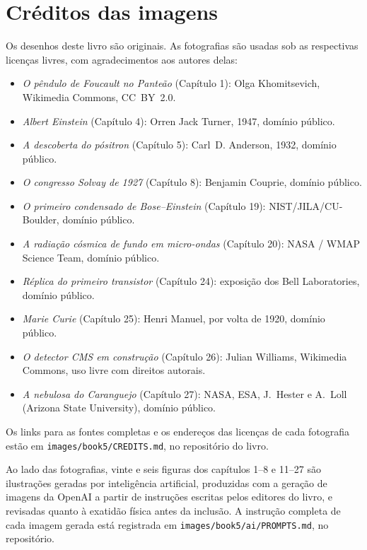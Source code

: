 \chapter*{Créditos das imagens}

Os desenhos deste livro são originais. As fotografias são usadas sob
as respectivas licenças livres, com agradecimentos aos autores delas:

\begin{itemize}
  \item \emph{O pêndulo de Foucault no Panteão} (Capítulo 1):
        Olga Khomitsevich, Wikimedia Commons, CC~BY~2.0.
  \item \emph{Albert Einstein} (Capítulo 4): Orren Jack Turner,
        1947, domínio público.
  \item \emph{A descoberta do pósitron} (Capítulo 5): Carl~D.
        Anderson, 1932, domínio público.
  \item \emph{O congresso Solvay de 1927} (Capítulo 8): Benjamin
        Couprie, domínio público.
  \item \emph{O primeiro condensado de Bose--Einstein}
        (Capítulo 19): NIST/JILA/CU-Boulder, domínio público.
  \item \emph{A radiação cósmica de fundo em micro-ondas}
        (Capítulo 20): NASA / WMAP Science Team, domínio público.
  \item \emph{Réplica do primeiro transistor} (Capítulo 24):
        exposição dos Bell Laboratories, domínio público.
  \item \emph{Marie Curie} (Capítulo 25): Henri Manuel, por volta de
        1920, domínio público.
  \item \emph{O detector CMS em construção} (Capítulo 26): Julian
        Williams, Wikimedia Commons, uso livre com direitos autorais.
  \item \emph{A nebulosa do Caranguejo} (Capítulo 27): NASA, ESA,
        J.~Hester e A.~Loll (Arizona State University), domínio
        público.
\end{itemize}

Os links para as fontes completas e os endereços das licenças de cada
fotografia estão em \texttt{images/book5/CREDITS.md}, no repositório
do livro.

\bigskip
Ao lado das fotografias, vinte e seis figuras dos capítulos 1--8 e
11--27 são ilustrações geradas por inteligência artificial,
produzidas com a geração de imagens da OpenAI a partir de instruções
escritas pelos editores do livro, e revisadas quanto à exatidão
física antes da inclusão. A instrução completa de cada imagem gerada
está registrada em \texttt{images/book5/ai/PROMPTS.md}, no
repositório.
\clearpage
